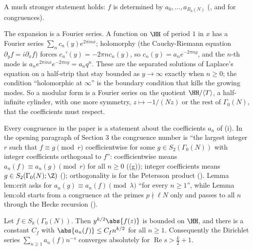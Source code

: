 A much stronger statement holds: $f$ is determined by $a_0,\dots,a_{B_k(N)}$ (, and  for congruences).

The expansion is a Fourier series. A function on $\HH$ of period $1$ in $x$ has a Fourier series $\sum_nc_n(y)e^{2\pi inx}$; holomorphy (the Cauchy-Riemann equation
$\partial_yf=i\partial_xf$) forces $c_n'(y)=-2\pi nc_n(y)$, so $c_n(y)=a_ne^{-2\pi ny}$, and the $n$-th mode is $a_ne^{2\pi inx}e^{-2\pi ny}=a_nq^n$. These are the separated solutions of
Laplace's equation on a half-strip that stay bounded as $y\to\infty$ exactly when $n\ge0$; the condition ``holomorphic at $\infty$'' is the boundary condition that kills the
growing modes. So a modular form is a Fourier series on the quotient $\HH/\langle T\rangle$, a half-infinite cylinder, with one more symmetry, $z\mapsto-1/(Nz)$ or the rest
of $\Gamma_0(N)$, that the coefficients must respect.

\begin{paperlink}\label{pl:modforms:coefficientwise}
Every congruence in the paper is a statement about the coefficients $a_n$ of (i). In the opening paragraph of Section 3 the
congruence number is ``the largest integer $r$ such that $f\equiv g\pmod r$ coefficientwise for some $g\in S_2(\Gamma_0(N))$ with integer coefficients orthogonal to
$f$'': coefficientwise means $a_n(f)\equiv a_n(g)\pmod r$ for all $n\ge0$ ((g)); integer coefficients means $g\in S_2(\Gamma_0(N);\Z)$
(); orthogonality is for the Petersson product (). Lemma lem:crit asks for $a_n(g)\equiv a_n(f)\pmod\lambda$
``for every $n\ge1$'', while Lemma lem:old starts from a congruence at the primes $p\nmid\ell N$ only and passes to all $n$ through the Hecke recursion
().
\end{paperlink}

\begin{proposition}\label{prop:modforms:hecke-bound}
Let $f\in S_k(\Gamma_0(N))$. Then $y^{k/2}\abs{f(z)}$ is bounded on $\HH$, and there is a constant $C_f$ with $\abs{a_n(f)}\le C_fn^{k/2}$ for all $n\ge1$. Consequently the
Dirichlet series $\sum_{n\ge1}a_n(f)n^{-s}$ converges absolutely for $\operatorname{Re}s>\frac k2+1$.
\end{proposition}

